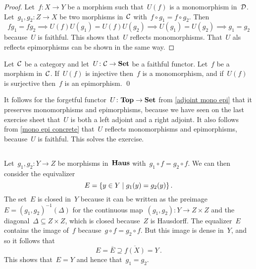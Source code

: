 \begin{proof}
  Let~$f \colon X \to Y$ be a morphism such that~$U(f)$ is a monomorphism in~$\mathcal{D}$.
  Let~$g_1, g_2 \colon Z \to X$ be two morphisms in~$\mathcal{C}$ with~$f \circ g_1 = f \circ g_2$.
  Then
  \[
              f g_1 = f g_2
    \implies  U(f) U(g_1) = U(f) U(g_2)
    \implies  U(g_1) = U(g_2)
    \implies  g_1 = g_2
  \]
  because~$U$ is faithful.
  This shows that~$U$ reflects monomorphisms.
  That~$U$ als reflects epimorphisms can be shown in the same way.
\end{proof}


\begin{corollary}
  \label{mono epi concrete}
  Let~$\mathcal{C}$ be a category and let~$U \colon \mathcal{C} \to \mathbf{Set}$ be a faithful functor.
  Let~$f$ be a morphism in~$\mathcal{C}$.
  If~$U(f)$ is injective then~$f$ is a monomorphism, and if~$U(f)$ is surjective then~$f$ is an epimorphism.
  \qed
\end{corollary}


It follows for the forgetful functor~$U \colon \mathbf{Top} \to \mathbf{Set}$ from \cref{adjoint mono epi} that it preserves monomorphisms and epimorphisms, because we have seen on the last exercise sheet that~$U$ is both a left adjoint and a right adjoint.
It also follows from \cref{mono epi concrete} that~$U$ reflects monomorphisms and epimorphisms, because~$U$ is faithful.
This solves the exercise.





\subsection{}

Let~$g_1, g_2 \colon Y \to Z$ be morphisms in~$\mathbf{Haus}$ with~$g_1 \circ f = g_2 \circ f$.
We can then consider the equivalizer
\[
    E
  = \{
      y \in Y
    \suchthat
      g_1(y) = g_2(y)
    \} \,.
\]
The set~$E$ is closed in~$Y$ because it can be written as the preimage~$E = (g_1, g_2)^{-1}(\Delta)$ for the continuous map~$(g_1, g_2) \colon Y \to Z \times Z$ and the diagonal~$\Delta \subseteq Z \times Z$, which is closed because~$Z$ is Hausdorff.
The equalizer~$E$ contains the image of~$f$ because~$g \circ f = g_2 \circ f$.
But this image is dense in~$Y$, and so it follows that
\[
            E
  =         \overline{E}
  \supseteq \overline{f(X)}
  =         Y \,.
\]
This shows that~$E = Y$ and hence that~$g_1 = g_2$.





